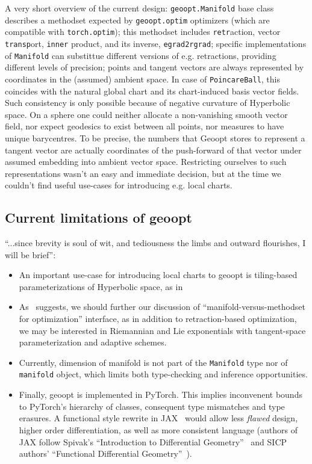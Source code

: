A very short overview of the current design: \texttt{geoopt.Manifold} base
class describes a methodset expected by \texttt{geoopt.optim} optimizers (which
are compatible with \texttt{torch.optim}); this methodset includes
\texttt{retr}action, vector \texttt{transp}ort, \texttt{inner} product, and its
inverse, \texttt{egrad2rgrad}; specific implementations of \texttt{Manifold}
can substittue different versions of e.g. retractions, providing different
levels of precision; points and tangent vectors are always represented by
coordinates in the (assumed) ambient space. In case of \texttt{PoincareBall},
this coincides with the natural global chart and its chart-induced basis vector
fields. Such consistency is only possible because of negative curvature of
Hyperbolic space. On a sphere one could neither allocate a non-vanishing smooth
vector field, nor expect geodesics to exist between all points, nor measures to
have unique barycentres. To be precise, the numbers that Geoopt stores to
represent a tangent vector are actually coordinates of the push-forward of that
vector under assumed embedding into ambient vector space. Restricting ourselves
to such representations wasn't an easy and immediate decision, but at the time
we couldn't find useful use-cases for introducing e.g. local charts.

\subsection{Current limitations of geoopt} \label{sec:geooptTodo}

``...since brevity is soul of wit, and tediousness the limbs and outward
flourishes, I will be brief'':
\begin{itemize}
\item An important use-case for introducing local charts to geoopt is tiling-based
parameterizations of Hyperbolic space, as in~\citet{yaSaTilingBased}
\item As~\citet{trivializations} suggests, we should further our discussion of
``manifold-versus-methodset for optimization'' interface, as in addition to
retraction-based optimization, we may be interested in Riemannian and Lie
exponentials with tangent-space parameterization and adaptive schemes.
\item Currently, dimension of manifold is not part of the \texttt{Manifold}
type nor of \texttt{manifold} object, which limits both type-checking and
inference opportunities.
\item Finally, geoopt is implemented in PyTorch. This implies inconvenent
    bounds to PyTorch's hierarchy of classes, consequent type mismatches and
        type erasures.  A functional style rewrite in JAX~\cite{jax2018github} would allow less
        \emph{flawed} design, higher order differentiation, as well as more
        consistent language (authors of JAX follow Spivak's ``Introduction to
        Differential Geometry''~\cite{spivak1970comprehensive} and
        SICP~\cite{abelson1996structure} authors' ``Functional Differential
        Geometry''~\cite{sussman2013functional}).
\end{itemize}

